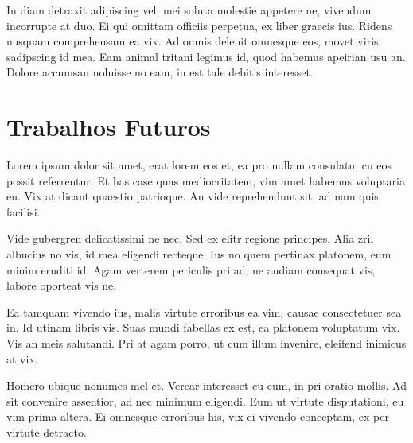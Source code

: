 	In diam detraxit adipiscing vel, mei soluta molestie appetere ne, vivendum incorrupte at duo. Ei qui omittam officiis perpetua, ex liber graecis ius. Ridens nusquam comprehensam ea vix. Ad omnis delenit omnesque eos, movet viris sadipscing id mea. Eam animal tritani legimus id, quod habemus apeirian usu an. Dolore accumsan noluisse no eam, in est tale debitis interesset.

	\section{Trabalhos Futuros}
	\label{sec:trabalhos-futuros}

		Lorem ipsum dolor sit amet, erat lorem eos et, ea pro nullam consulatu, cu eos possit referrentur. Et has case quas mediocritatem, vim amet habemus voluptaria eu. Vix at dicant quaestio patrioque. An vide reprehendunt sit, ad nam quis facilisi.

		Vide gubergren delicatissimi ne nec. Sed ex elitr regione principes. Alia zril albucius no vis, id mea eligendi recteque. Ius no quem pertinax platonem, eum minim eruditi id. Agam verterem periculis pri ad, ne audiam consequat vis, labore oporteat vis ne.

		Ea tamquam vivendo ius, malis virtute erroribus ea vim, causae consectetuer sea in. Id utinam libris vis. Suas mundi fabellas ex est, ea platonem voluptatum vix. Vis an meis salutandi. Pri at agam porro, ut cum illum invenire, eleifend inimicus at vix.

		Homero ubique nonumes mel et. Verear interesset cu eum, in pri oratio mollis. Ad sit convenire assentior, ad nec minimum eligendi. Eum ut virtute disputationi, eu vim prima altera. Ei omnesque erroribus his, vix ei vivendo conceptam, ex per virtute detracto.
